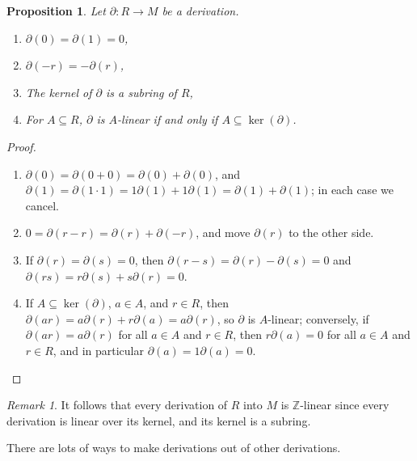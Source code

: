 \documentclass{amsart}[12pt]
\def\ker{\operatorname{ker}}
\newcommand{\Z}{\mathbb{Z}}
\numberwithin{equation}{section}
\theoremstyle{plain} %
\newtheorem{prop}[equation]{Proposition}
\theoremstyle{definition}
\theoremstyle{remark}
\newtheorem{rem}[equation]{Remark}
\begin{document}
\begin{prop} Let $\partial:R\to M$ be a derivation.
\begin{enumerate}
\item $\partial(0)=\partial(1)=0$,
\item $\partial(-r) = -\partial(r)$,
\item The kernel of $\partial$ is a subring of $R$,
\item For $A\subseteq R$, $\partial$ is $A$-linear if and only if $A\subseteq \ker(\partial)$.
\end{enumerate}
\end{prop}
\begin{proof} 
\begin{enumerate}
\item $\partial(0) = \partial(0+0) = \partial(0) +\partial(0)$, and
$\partial(1)=\partial(1\cdot 1) = 1 \partial(1) + 1 \partial(1) = \partial(1) +\partial(1)$; in each case we cancel.
\item $0=\partial(r-r)= \partial(r) + \partial(-r)$, and move $\partial(r)$ to the other side.
\item If $\partial(r) = \partial(s)=0$, then $\partial(r-s) = \partial(r) - \partial(s) = 0$ and $\partial(rs) = r\partial(s) + s\partial(r)=0$.
\item If $A\subseteq \ker(\partial)$, $a\in A$, and $r\in R$, then $\partial(ar) = a \partial(r) + r\partial(a)= a\partial(r)$, so $\partial$ is $A$-linear; conversely, if $\partial(ar) = a \partial(r)$ for all $a\in A$ and $r\in R$, then $r\partial(a) = 0$ for all $a\in A$ and $r\in R$, and in particular $\partial(a)=1\partial(a)=0$.\qedhere
\end{enumerate}
\end{proof}

\begin{rem} It follows that every derivation of $R$ into $M$ is $\Z$-linear since every derivation is linear over its kernel, and its kernel is a subring.
\end{rem}

There are lots of ways to make derivations out of other derivations.
\end{document}
